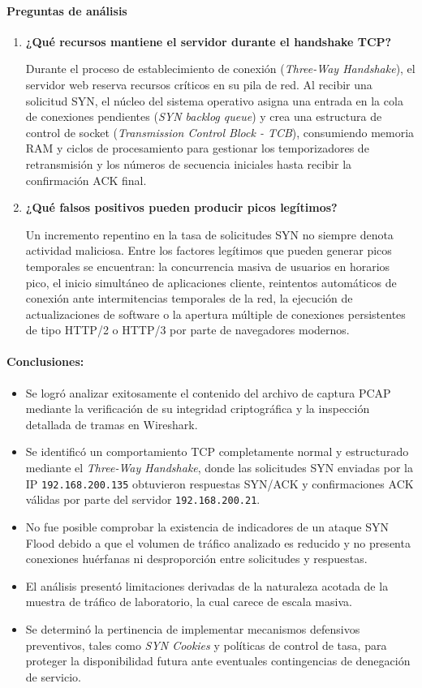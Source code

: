 \paragraph{Preguntas de análisis}
\begin{enumerate}
    \item \textbf{¿Qué recursos mantiene el servidor durante el handshake TCP?}\par
    Durante el proceso de establecimiento de conexión (\textit{Three-Way Handshake}), el servidor web reserva recursos críticos en su pila de red. Al recibir una solicitud SYN, el núcleo del sistema operativo asigna una entrada en la cola de conexiones pendientes (\textit{SYN backlog queue}) y crea una estructura de control de socket (\textit{Transmission Control Block - TCB}), consumiendo memoria RAM y ciclos de procesamiento para gestionar los temporizadores de retransmisión y los números de secuencia iniciales hasta recibir la confirmación ACK final.
    \item \textbf{¿Qué falsos positivos pueden producir picos legítimos?}\par
    Un incremento repentino en la tasa de solicitudes SYN no siempre denota actividad maliciosa. Entre los factores legítimos que pueden generar picos temporales se encuentran: la concurrencia masiva de usuarios en horarios pico, el inicio simultáneo de aplicaciones cliente, reintentos automáticos de conexión ante intermitencias temporales de la red, la ejecución de actualizaciones de software o la apertura múltiple de conexiones persistentes de tipo HTTP/2 o HTTP/3 por parte de navegadores modernos.
\end{enumerate}

\paragraph{Conclusiones:}
\begin{itemize}
    \item Se logró analizar exitosamente el contenido del archivo de captura PCAP mediante la verificación de su integridad criptográfica y la inspección detallada de tramas en Wireshark.
    \item Se identificó un comportamiento TCP completamente normal y estructurado mediante el \textit{Three-Way Handshake}, donde las solicitudes SYN enviadas por la IP \texttt{192.168.200.135} obtuvieron respuestas SYN/ACK y confirmaciones ACK válidas por parte del servidor \texttt{192.168.200.21}.
    \item No fue posible comprobar la existencia de indicadores de un ataque SYN Flood debido a que el volumen de tráfico analizado es reducido y no presenta conexiones huérfanas ni desproporción entre solicitudes y respuestas.
    \item El análisis presentó limitaciones derivadas de la naturaleza acotada de la muestra de tráfico de laboratorio, la cual carece de escala masiva.
    \item Se determinó la pertinencia de implementar mecanismos defensivos preventivos, tales como \textit{SYN Cookies} y políticas de control de tasa, para proteger la disponibilidad futura ante eventuales contingencias de denegación de servicio.
\end{itemize}

